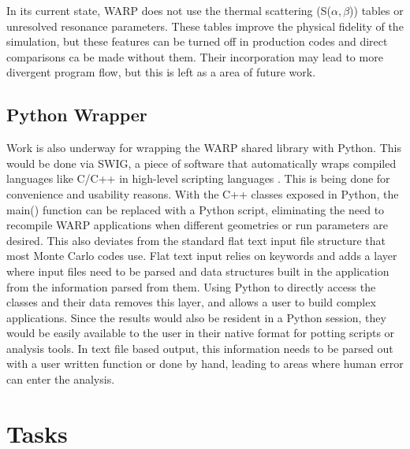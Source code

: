In its current state, WARP does not use the thermal scattering (S($\alpha,$$\beta$)) tables or unresolved resonance parameters.   These tables improve the physical fidelity of the simulation, but these features can be turned off in production codes and direct comparisons ca be made without them.  Their incorporation may lead to more divergent program flow, but this is left as a area of future work.

\subsection{Python Wrapper}

Work is also underway for wrapping the WARP shared library with Python.  This would be done via SWIG, a piece of software that automatically wraps compiled languages like C/C++ in high-level scripting languages \cite{swig}.  This is being done for convenience and usability reasons.  With the C++ classes exposed in Python, the main() function can be replaced with a Python script, eliminating the need to recompile WARP applications when different geometries or run parameters are desired.  This also deviates from the standard flat text input file structure that most Monte Carlo codes use.  Flat text input relies on keywords and adds a layer where input files need to be parsed and data structures built in the application from the information parsed from them.  Using Python to directly access the classes and their data removes this layer, and allows a user to build complex applications.  Since the results would also be resident in a Python session, they would be easily available to the user in their native format for potting scripts or analysis tools.  In text file based output, this information needs to be parsed out with a user written function or done by hand, leading to areas where human error can enter the analysis.


\section{Tasks}
\label{sec:tasks}

